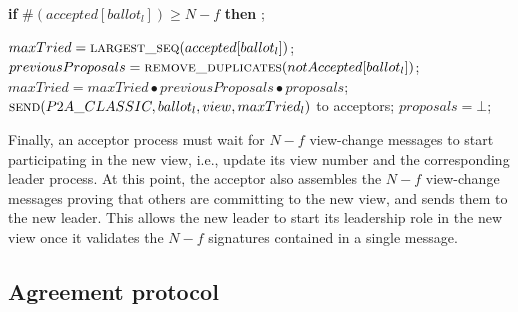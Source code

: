 \begin{algorithm}
\begin{algorithmic}[1]
		\State 
		\State \hspace{\algorithmicindent}\hspace{\algorithmicindent} \textbf{if} $\#(accepted[ballot_l]) \geq N-f$ \textbf{then} 
		\State \hspace{\algorithmicindent}\hspace{\algorithmicindent}\hspace{\algorithmicindent} ;
		
		\State
		\State $maxTried = \Call{largest\_seq}{accepted[ballot_l]}$;
		\State $previousProposals = \Call{remove\_duplicates}{notAccepted[ballot_l]}$;
		\State $maxTried = maxTried \bullet previousProposals \bullet proposals$;
		\State $\Call{send}{P2A\_CLASSIC,ballot_l,view, maxTried_l}$ to acceptors;
		\State $proposals = \bot$;
		\EndFunction
		
	\end{algorithmic}
\end{algorithm}

Finally, an acceptor process must wait for $N-f$ view-change messages to start participating in the new view, i.e., update its view number and the corresponding leader process. At this point, the acceptor also assembles the $N-f$ view-change messages proving that others are committing to the new view, and sends them to the new leader. This allows the new leader to start its leadership role in the new view once it validates the $N-f$ signatures contained in a single message.

\subsection{Agreement protocol} 

